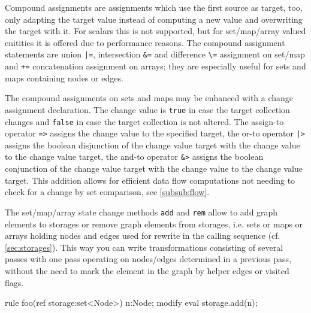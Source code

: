 
Compound assignments are assignments which use the first source as target, too,
only adapting the target value instead of computing a new value and overwriting the target with it.
For scalars this is not supported, but for set/map/array valued enitities it is offered due to performance reasons.
The compound assignment statements are union \verb#|=#, intersection \verb#&=# and difference \verb#\=# assignment on set/map and \verb#+=# concatenation assignment on arrays; they are especially useful for sets and maps containing nodes or edges.

The compound assignments on sets and maps may be enhanced with a change assignment declaration.
The change value is \texttt{true} in case the target collection changes and \texttt{false} in case the target collection is not altered.
The assign-to operator \verb#=># assigns the change value to the specified target, the or-to operator \verb#|># assigns the boolean disjunction of the change value target with the change value to the change value target, the and-to operator \verb#&># assigns the boolean conjunction of the change value target with the change value to the change value target.
This addition allows for efficient data flow computations not needing to check for a change by set comparison, see \ref{subsub:flow}.


\begin{example}
The set/map/array state change methods \texttt{add} and \texttt{rem} allow to add graph elements to storages or remove graph elements from storages, i.e. sets or maps or arrays holding nodes and edges used for rewrite in the calling sequence (cf. \ref{sec:storages}).
This way you can write transformations consisting of several passes with one pass operating on nodes/edges determined in a previous pass,
without the need to mark the element in the graph by helper edges or visited flags.
	\begin{grgen}
rule foo(ref storage:set<Node>)
{
  n:Node;
  modify {
    eval {
      storage.add(n);
    }
  }
}  
	\end{grgen}
\end{example}


